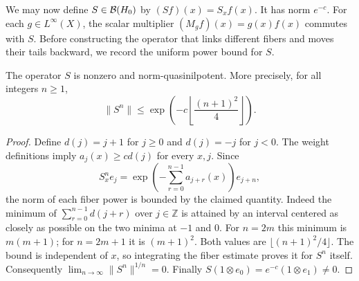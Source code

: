 We may now define $S\in\mathcal B(H_0)$ by $(Sf)(x)=S_xf(x)$. It has norm $e^{-c}$. For each $g\in L^\infty(X)$, the scalar multiplier $(M_gf)(x)=g(x)f(x)$ commutes with $S$. Before constructing the operator that links different fibers and moves their tails backward, we record the uniform power bound for $S$.

\begin{proposition}\label{prop:normquasi}
The operator $S$ is nonzero and norm-quasinilpotent. More precisely, for
all integers $n\ge1$,
\[
 \|S^n\|\le \exp\left(-c\left\lfloor\frac{(n+1)^2}{4}\right\rfloor\right).
\]
\end{proposition}
\begin{proof}
Define $d(j)=j+1$ for $j\ge0$ and $d(j)=-j$ for $j<0$. The weight definitions
imply $a_j(x)\ge c d(j)$ for every $x,j$. Since
\[
 S_x^n e_j=\exp\left(-\sum_{r=0}^{n-1}a_{j+r}(x)\right)e_{j+n},
\]
the norm of each fiber power is bounded by the claimed quantity. Indeed the
minimum of $\sum_{r=0}^{n-1}d(j+r)$ over $j\in\mathbb Z$ is attained by an
interval centered as closely as possible on the two minima at $-1$ and $0$.
For $n=2m$ this minimum is $m(m+1)$; for $n=2m+1$ it is $(m+1)^2$.
Both values are $\lfloor(n+1)^2/4\rfloor$. The bound is independent of $x$,
so integrating the fiber estimate proves it for $S^n$ itself. Consequently
$\lim_{n\to\infty}\|S^n\|^{1/n}=0$. Finally
$S(1\otimes e_0)=e^{-c}(1\otimes e_1)\ne0$.
\end{proof}
